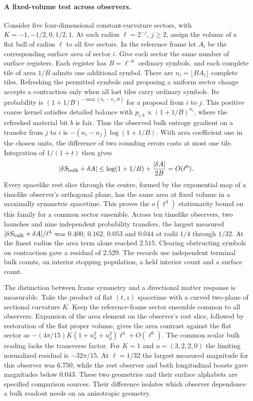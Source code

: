 \documentclass[11pt]{article}
\begin{document}
\paragraph{A fixed-volume test across observers.}
Consider five four-dimensional constant-curvature sectors, with
$K=-1,-1/2,0,1/2,1$. At each radius $\ell=2^{-j}$, $j\geq2$, assign
the volume of a flat ball of radius $\ell$ to all five sectors. In the
reference frame let $A_i$ be the corresponding surface area of sector
$i$. Give each sector the same number of surface registers. Each
register has $B=\ell^{-6}$ ordinary symbols, and each complete tile of
area $1/B$ admits one additional symbol. There are
$n_i=\lfloor B A_i\rfloor$ complete tiles. Refreshing the permitted
symbols and proposing a uniform sector change accepts a contraction
only when all lost tiles carry ordinary symbols. Its probability is
$(1+1/B)^{-\max(n_i-n_j,0)}$ for a proposal from $i$ to $j$. This
positive coarse kernel satisfies detailed balance with
$p_{i,b}\propto(1+1/B)^{n_i}$, where the refreshed material bit $b$ is
fair. Thus the observed bulk entropy gradient on a transfer from $j$
to $i$ is $-(n_i-n_j)\log(1+1/B)$. With area coefficient one in the
chosen units, the difference of two rounding errors costs at most one
tile. Integration of $1/(1+t)$ then gives
\[
 \left|\delta S_{\rm bulk}+\delta A\right|
 \leq \log(1+1/B)+\frac{|\delta A|}{2B}=O(\ell^6).
\]
Every spacelike rest slice through the centre, formed by the exponential
map of a timelike observer's orthogonal plane, has the same area at
fixed volume in a maximally symmetric spacetime. This proves the
$o(\ell^4)$ stationarity bound on this family for a common sector
ensemble. Across ten timelike observers, two launches and nine independent
probability transfers, the largest measured $|\delta S_{\rm bulk}+\delta
A|/\ell^4$ was $0.400$, $0.162$, $0.053$ and $0.044$ at radii $1/4$
through $1/32$. At the finest radius the area term alone reached $2.515$.
Clearing obstructing symbols on contraction gave a residual of $2.529$.
The records use independent terminal bulk counts, an interior stopping
population, a held interior count and a surface count.

The distinction between frame symmetry and a directional matter response
is measurable. Take the product of flat $(t,z)$ spacetime with a curved
two-plane of sectional curvature $K$. Keep the reference-frame sector
ensemble common to all observers. Expansion of the area element on the
observer's rest slice, followed by restoration of the flat proper volume,
gives the area contrast against the flat sector as
$-(4\pi/15)K(1+u_x^2+u_y^2)\ell^4+O(\ell^6)$. The common scalar bulk
reading lacks the transverse factor. For $K=1$ and $u=(3,2,2,0)$ the
limiting normalized residual is $-32\pi/15$. At $\ell=1/32$ the
largest measured magnitude for this observer was $6.750$, while the
rest observer and both longitudinal boosts gave magnitudes below $0.043$.
These two geometries and their surface alphabets are specified comparison
sources. Their difference isolates which observer dependence a bulk
readout needs on an anisotropic geometry.
\end{document}
